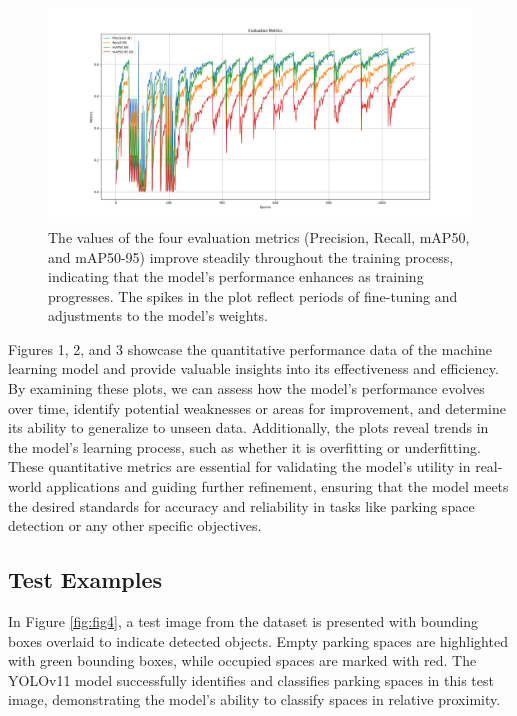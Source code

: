 \documentclass[conference]{IEEEtran}
\begin{document}
\begin{figure}[h]
    \centering
    \includegraphics[scale=0.2]{Figure_3.png}
    \caption{
        The values of the four evaluation metrics 
        (Precision, Recall, mAP50, and mAP50-95) 
        improve steadily throughout the training process, 
        indicating that the model's performance enhances as training progresses. 
        The spikes in the plot reflect periods of fine-tuning and adjustments to the model’s weights.   
    }
    \label{fig:fig3}
\end{figure}

Figures 1, 
2, 
and 3 showcase the quantitative performance data of the machine learning model and provide valuable insights into its effectiveness and efficiency. 
By examining these plots, 
we can assess how the model's performance evolves over time, 
identify potential weaknesses or areas for improvement, 
and determine its ability to generalize to unseen data. 
Additionally, 
the plots reveal trends in the model's learning process, 
such as whether it is overfitting or underfitting. 
These quantitative metrics are essential for validating the model’s utility in real-world applications and guiding further refinement, 
ensuring that the model meets the desired standards for accuracy and reliability in tasks like parking space detection or any other specific objectives.


\subsection{Test Examples}

In Figure \ref{fig:fig4}, 
a test image from the dataset is presented with bounding boxes overlaid to indicate detected objects. 
Empty parking spaces are highlighted with green bounding boxes, 
while occupied spaces are marked with red. 
The YOLOv11 model successfully identifies and classifies parking spaces in this test image, 
demonstrating the model's ability to classify spaces in relative proximity.
\end{document}
